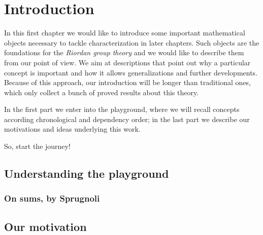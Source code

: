 
\chapter{Introduction}

In this first chapter we would like to introduce some
important mathematical objects necessary to tackle 
characterization in later chapters. Such objects are the 
foundations for the \emph{Riordan group theory} and 
we would like to describe them from our point of view.
We aim at descriptions that point out why a particular 
concept is important and how it allows generalizations
and further developments. Because of this approach,
our introduction will be longer than traditional ones,
which only collect a bunch of proved results about this theory.

In the first part we enter into the playground, where
we will recall concepts according chronological and
dependency order; in the last part we describe our motivations
and ideas underlying this work. 

So, start the journey!

\section{Understanding the playground}






\subsection{On sums, by Sprugnoli}


\section{Our motivation}
